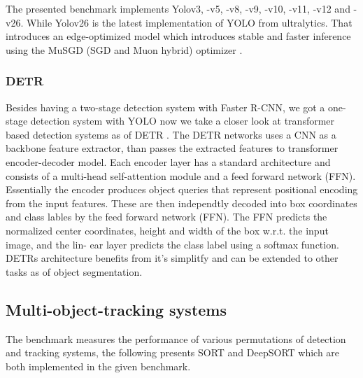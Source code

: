 The presented benchmark implements Yolov3, -v5, -v8, -v9, -v10, -v11, -v12 and -v26.
While Yolov26 is the latest implementation of YOLO from ultralytics. \cite{bibid} That introduces
an edge-optimized model which introduces stable and faster inference using the MuSGD (SGD and Muon hybrid) optimizer \cite{yolov26}.

\subsubsection{DETR}

Besides having a two-stage detection system with Faster R-CNN, we got a one-stage detection system
with YOLO now we take a closer look at transformer based detection systems as of DETR \cite{detr}.
The DETR networks uses a CNN as a backbone feature extractor, than passes the extracted features
to transformer encoder-decoder model. Each encoder layer has a standard architecture and consists of a multi-head self-attention module and a feed forward network (FFN). Essentially the 
encoder produces object queries that represent positional encoding from the input features.
These are then independtly decoded into box coordinates and class lables by the feed forward
network (FFN). The FFN predicts the normalized center
coordinates, height and width of the box w.r.t. the input image, and the lin-
ear layer predicts the class label using a softmax function. DETRs architecture benefits 
from it's simplitfy and can be extended to other tasks as of object segmentation.

\subsection{Multi-object-tracking systems}

The benchmark measures the performance of various permutations of detection and tracking systems, the following presents SORT and DeepSORT which are both implemented in the given benchmark.

